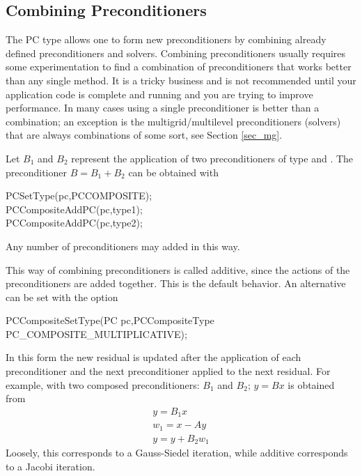 \subsection{Combining Preconditioners} 

The PC type   allows one to form 
new preconditioners by combining already defined preconditioners and 
solvers. Combining preconditioners usually requires some experimentation
to find a combination of preconditioners that works better than any
single method. It is a tricky business and is not recommended until 
your application code is complete and running and you are trying to 
improve performance. In many cases using a single preconditioner is better
than a combination; an exception is the multigrid/multilevel preconditioners
(solvers) that are always combinations of some sort, see Section \ref{sec_mg}.

Let $B_1$ and $B_2$ represent the application of two 
preconditioners of type  and . The preconditioner
$ B = B_1 + B_2 $ can be obtained with
\begin{tabbing}
  PCSetType(pc,PCCOMPOSITE);\\
  PCCompositeAddPC(pc,type1);\\
  PCCompositeAddPC(pc,type2);
\end{tabbing}
Any number of preconditioners may added in this way. 

This way of combining preconditioners is called additive, since 
the actions of the preconditioners are added together. This is the 
default behavior. An alternative can be set with the option
\begin{tabbing}
  PCCompositeSetType(PC pc,PCCompositeType PC\_COMPOSITE\_MULTIPLICATIVE);
\end{tabbing}
 
  
In this form the new residual is updated after the application of 
each preconditioner and the next preconditioner applied to the next 
residual. For example, with two composed preconditioners: $B_1$ and 
$ B_2$; $ y = B x $ is obtained from
\begin{eqnarray*}
  y    = B_1 x \\
  w_1  = x - A y \\
  y    = y + B_2 w_1 
\end{eqnarray*}
Loosely, this corresponds to a Gauss-Siedel iteration, while
additive corresponds to a Jacobi iteration.

